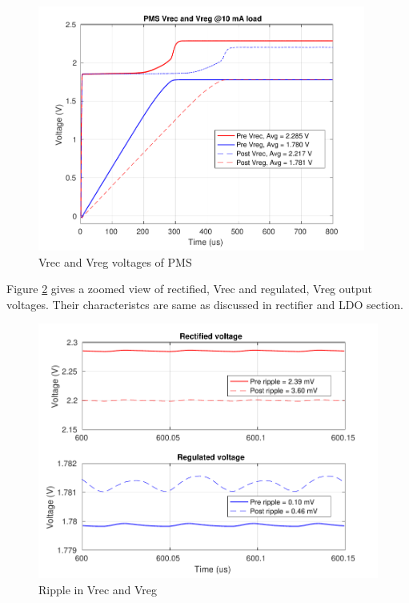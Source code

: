 \documentclass[12pt,a4paper,UKenglish]{report}
\begin{document}
\begin{figure} [H]
  \centering
  \includegraphics[width=0.96\textwidth]{img/pms/pms2_Vout_both.pdf} 
 \caption{Vrec and Vreg voltages of PMS} 
\label{fig:pms_vout} 
\end{figure}

Figure \ref{fig:pms_ripple} gives a zoomed view of rectified, Vrec and regulated, Vreg output voltages. Their 
characteristcs are same as discussed in rectifier and LDO section. \\

\begin{figure} [H]
  \centering
  \includegraphics[width=\textwidth]{img/pms/pms2_ripple_both.pdf} 
 \caption{Ripple in Vrec and Vreg} 
\label{fig:pms_ripple} 
\end{figure}
\end{document}
